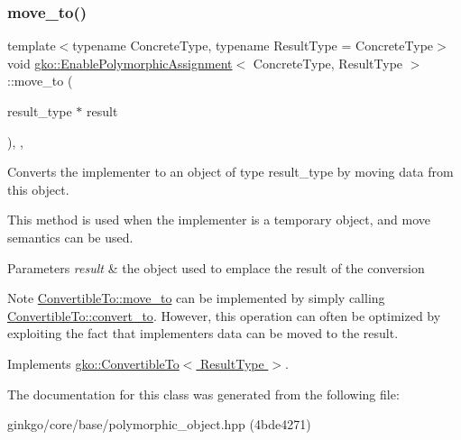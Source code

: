 \subsubsection{\texorpdfstring{move\+\_\+to()}{move\_to()}}
{\footnotesize\ttfamily template$<$typename Concrete\+Type, typename Result\+Type = Concrete\+Type$>$ \\
void \hyperlink{classgko_1_1EnablePolymorphicAssignment}{gko\+::\+Enable\+Polymorphic\+Assignment}$<$ Concrete\+Type, Result\+Type $>$\+::move\+\_\+to (\begin{DoxyParamCaption}\item[{result\+\_\+type $\ast$}]{result }\end{DoxyParamCaption})\hspace{0.3cm}{\ttfamily [inline]}, {\ttfamily [override]}, {\ttfamily [virtual]}}



Converts the implementer to an object of type result\+\_\+type by moving data from this object. 

This method is used when the implementer is a temporary object, and move semantics can be used.


\begin{DoxyParams}{Parameters}
{\em result} & the object used to emplace the result of the conversion\\
\hline
\end{DoxyParams}
\begin{DoxyNote}{Note}
\hyperlink{classgko_1_1ConvertibleTo_ab9047c7c49e0f83c79b54c0034d6197b}{Convertible\+To\+::move\+\_\+to} can be implemented by simply calling \hyperlink{classgko_1_1ConvertibleTo_aa7f3420babcbed39ee15bc020bed4f7e}{Convertible\+To\+::convert\+\_\+to}. However, this operation can often be optimized by exploiting the fact that implementer\textquotesingle{}s data can be moved to the result. 
\end{DoxyNote}


Implements \hyperlink{classgko_1_1ConvertibleTo_ab9047c7c49e0f83c79b54c0034d6197b}{gko\+::\+Convertible\+To$<$ Result\+Type $>$}.



The documentation for this class was generated from the following file\+:\begin{DoxyCompactItemize}
\item 
ginkgo/core/base/polymorphic\+\_\+object.\+hpp (4bde4271)\end{DoxyCompactItemize}
